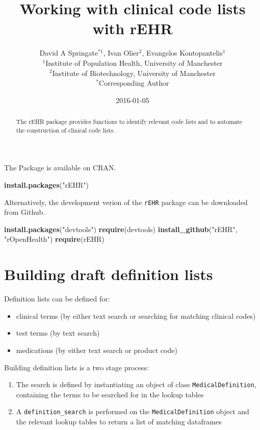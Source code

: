 \documentclass[]{article}
\title{Working with clinical code lists with rEHR}
\author{David A Springate\(^{*1}\), Ivan Olier\(^{2}\), Evangelos
Kontopantelis\(^{1}\) \\ \(^{1}\)Institute of Population Health, University of Manchester \\ \(^{2}\)Institute of Biotechnology, University of Manchester \\ \(^{*}\)Corresponding Author}
\date{2016-01-05}
\newenvironment{Shaded}{\begin{snugshade}}{\end{snugshade}}
\newcommand{\KeywordTok}[1]{\textcolor[rgb]{0.13,0.29,0.53}{\textbf{{#1}}}}
\newcommand{\StringTok}[1]{\textcolor[rgb]{0.31,0.60,0.02}{{#1}}}
\newcommand{\NormalTok}[1]{{#1}}
\begin{document}
\maketitle

\begin{abstract}
The rEHR package provides functions to identify relevant code lists and
to automate the construction of clinical code lists.
\end{abstract}

The Package is available on CRAN.

\begin{Shaded}
\begin{Highlighting}[]
\KeywordTok{install.packages}\NormalTok{(}\StringTok{"rEHR"}\NormalTok{)}
\end{Highlighting}
\end{Shaded}

Alternatively, the development verion of the \texttt{rEHR} package can
be downloaded from Github.

\begin{Shaded}
\begin{Highlighting}[]
\KeywordTok{install.packages}\NormalTok{(}\StringTok{"devtools"}\NormalTok{)}
\KeywordTok{require}\NormalTok{(devtools)}
\KeywordTok{install_github}\NormalTok{(}\StringTok{"rEHR"}\NormalTok{, }\StringTok{"rOpenHealth"}\NormalTok{)}
\KeywordTok{require}\NormalTok{(rEHR)}
\end{Highlighting}
\end{Shaded}

\section{Building draft definition
lists}\label{building-draft-definition-lists}

Definition lists can be defined for:

\begin{itemize}
\itemsep1pt\parskip0pt
\item
  clinical terms (by either text search or searching for matching
  clinical codes)
\item
  test terms (by text search)
\item
  medications (by either text search or product code)
\end{itemize}

Building definition lists is a two stage process:

\begin{enumerate}
\def\labelenumi{\arabic{enumi}.}
\itemsep1pt\parskip0pt
\item
  The search is defined by instantiating an object of class
  \texttt{MedicalDefinition}, containing the terms to be searched for in
  the lookup tables
\item
  A \texttt{definition\_search} is performed on the
  \texttt{MedicalDefinition} object and the relevant lookup tables to
  return a list of matching dataframes
\end{enumerate}
\end{document}
